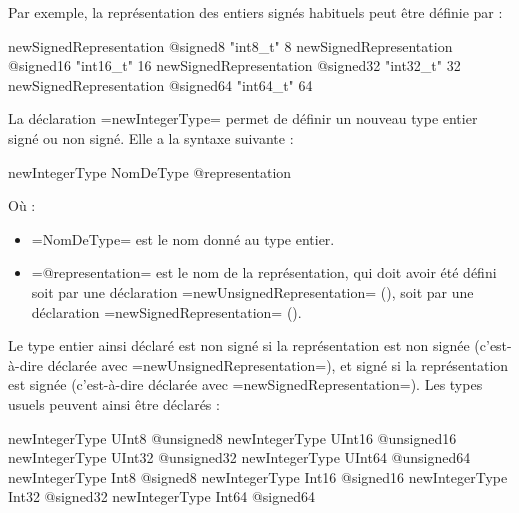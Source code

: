 Par exemple, la représentation des entiers signés habituels peut être définie par :
\begin{PLM}
newSignedRepresentation @signed8  "int8_t"   8
newSignedRepresentation @signed16 "int16_t" 16
newSignedRepresentation @signed32 "int32_t" 32
newSignedRepresentation @signed64 "int64_t" 64
\end{PLM}












La déclaration \plm=newIntegerType= permet de définir un nouveau type entier signé ou non signé. Elle a la syntaxe suivante :
\begin{PLM}
newIntegerType NomDeType @representation
\end{PLM}
Où :
\begin{itemize}
  \item \plm=NomDeType= est le nom donné au type entier.
  \item \plm=@representation= est le nom de la représentation, qui doit avoir été défini soit par une déclaration \plm=newUnsignedRepresentation= (), soit par une déclaration \plm=newSignedRepresentation= ().
\end{itemize}

Le type entier ainsi déclaré est non signé si la représentation est non signée (c'est-à-dire déclarée avec \plm=newUnsignedRepresentation=), et signé si la représentation est signée (c'est-à-dire déclarée avec \plm=newSignedRepresentation=). Les types usuels peuvent ainsi être déclarés :
\begin{PLM}
newIntegerType UInt8  @unsigned8
newIntegerType UInt16 @unsigned16
newIntegerType UInt32 @unsigned32
newIntegerType UInt64 @unsigned64
newIntegerType Int8  @signed8
newIntegerType Int16 @signed16
newIntegerType Int32 @signed32
newIntegerType Int64 @signed64
\end{PLM}






